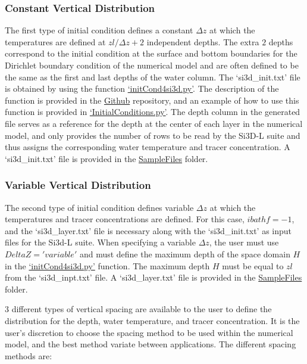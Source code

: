 \subsubsection{Constant Vertical Distribution}

The first type of initial condition defines a constant $\Delta z$ at which the temperatures are defined at $zl/\Delta z + 2$ independent depths. The extra $2$ depths correspond to the initial condition at the surface and bottom boundaries for the Dirichlet boundary condition of the numerical model and are often defined to be the same as the first and last depths of the water column. The `si3d\_init.txt' file is obtained by using the function \href{https://github.com/SI3DL/si3dInputs}{`initCond4si3d.py'}. The description of the function is provided in the \href{https://github.com/SI3DL/si3dInputs}{Github} repository, and an example of how to use this function is provided in \href{https://github.com/SI3DL/si3dInitialConditions}{`InitialConditions.py'}. The depth column in the generated file serves as a reference for the depth at the center of each layer in the numerical model, and only provides the number of rows to be read by the Si3D-L suite and thus assigns the corresponding water temperature and tracer concentration. A `si3d\_init.txt' file is provided in the \href{https://github.com/SI3DL/psi3d/tree/main/SampleFiles}{SampleFiles} folder.

\subsubsection{Variable Vertical Distribution}

The second type of initial condition defines variable $\Delta z$ at which the temperatures and tracer concentrations are defined. For this case, $ibathf = -1$, and the `si3d\_layer.txt' file is necessary along with the `si3d\_init.txt' as input files for the Si3d-L suite. When specifying a variable $\Delta z$, the user must use $DeltaZ = 'variable'$ and must define the maximum depth of the space domain $H$ in the \href{https://github.com/SI3DL/si3dInputs}{`initCond4si3d.py'} function. The maximum depth $H$ must be equal to $zl$ from the `si3d\_inpt.txt' file. A `si3d\_layer.txt' file is provided in the \href{https://github.com/SI3DL/psi3d/tree/main/SampleFiles}{SampleFiles} folder. 

3 different types of vertical spacing are available to the user to define the distribution for the depth, water temperature, and tracer concentration. It is the user's discretion to choose the spacing method to be used within the numerical model, and the best method variate between applications. The different spacing methods are:

